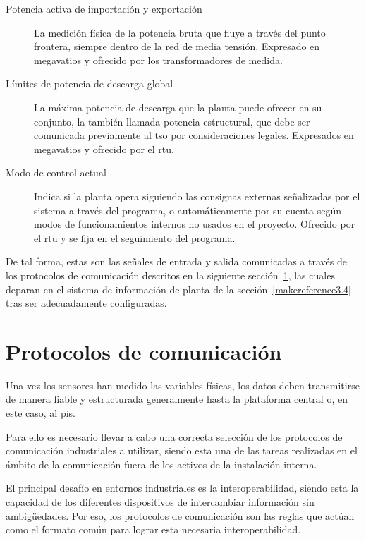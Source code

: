\begin{description}
  \item[Potencia activa de importación y exportación] La medición física de la potencia bruta que fluye a través del punto frontera, siempre dentro de la red de media tensión. Expresado en megavatios y ofrecido por los transformadores de medida.

  \item[Límites de potencia de descarga global] La máxima potencia de descarga que la planta puede ofrecer en su conjunto, la también llamada potencia estructural, que debe ser comunicada previamente al \gls{tso} por consideraciones legales. Expresados en megavatios y ofrecido por el \gls{rtu}.

  \item[Modo de control actual] Indica si la planta opera siguiendo las consignas externas señalizadas por el sistema a través del programa, o automáticamente por su cuenta según modos de funcionamientos internos no usados en el proyecto. Ofrecido por el \gls{rtu} y se fija en el seguimiento del programa.

\end{description}

De tal forma, estas son las señales de entrada y salida comunicadas a través de los protocolos de comunicación descritos en la siguiente sección~\ref{makereference3.3}, las cuales deparan en el sistema de información de planta de la sección~\ref{makereference3.4} tras ser adecuadamente configuradas.

\section{Protocolos de comunicación}%
\label{makereference3.3}

Una vez los sensores han medido las variables físicas, los datos deben transmitirse de manera fiable y estructurada generalmente hasta la plataforma central o, en este caso, al \gls{pis}.

Para ello es necesario llevar a cabo una correcta selección de los protocolos de comunicación industriales a utilizar, siendo esta una de las tareas realizadas en el ámbito de la comunicación fuera de los activos de la instalación interna.

El principal desafío en entornos industriales es la interoperabilidad, siendo esta la capacidad de los diferentes dispositivos de intercambiar información sin ambigüedades. Por eso, los protocolos de comunicación son las reglas que actúan como el formato común para lograr esta necesaria interoperabilidad.

